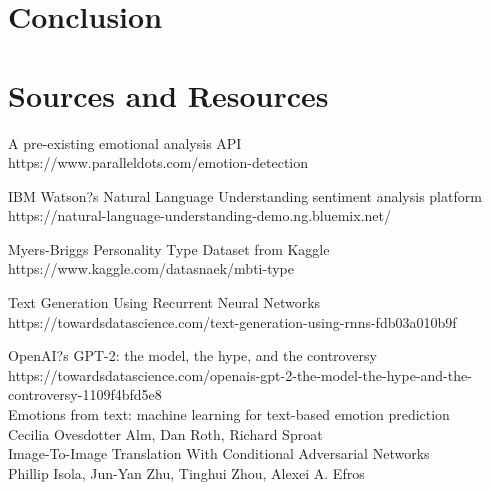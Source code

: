 \documentclass{article}
\begin{document}
\section{Conclusion}



\newpage
\section{Sources and Resources}
A pre-existing emotional analysis API \\
https://www.paralleldots.com/emotion-detection\newline
 
IBM Watson?s Natural Language Understanding sentiment analysis platform\\
https://natural-language-understanding-demo.ng.bluemix.net/\newline
 
Myers-Briggs Personality Type Dataset from Kaggle\\
https://www.kaggle.com/datasnaek/mbti-type \newline

Text Generation Using Recurrent Neural Networks\\
https://towardsdatascience.com/text-generation-using-rnns-fdb03a010b9f \newline

OpenAI?s GPT-2: the model, the hype, and the controversy
https://towardsdatascience.com/openais-gpt-2-the-model-the-hype-and-the-controversy-1109f4bfd5e8\\

Emotions from text: machine learning for text-based emotion prediction\\
Cecilia Ovesdotter Alm, Dan Roth, Richard Sproat\\

Image-To-Image Translation With Conditional Adversarial Networks\\
Phillip Isola, Jun-Yan Zhu, Tinghui Zhou, Alexei A. Efros\\
\end{document}
